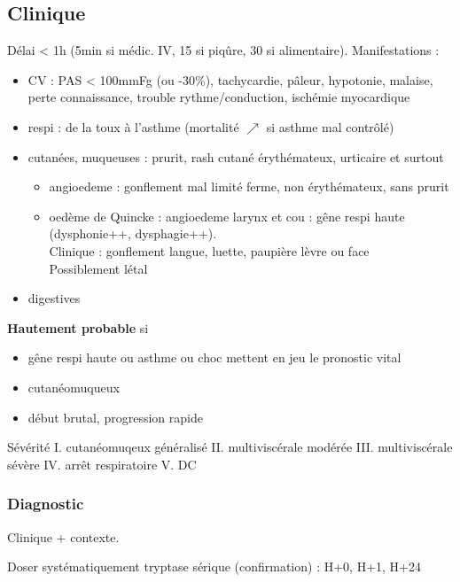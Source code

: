 \documentclass{book}
\begin{document}
\subsection{Clinique}
\label{sec:orge468f6b}
Délai < 1h (5min si médic. IV, 15 si piqûre, 30 si alimentaire).
Manifestations :

\begin{itemize}
\item CV : PAS < 100mmFg (ou -30\%), tachycardie, pâleur, hypotonie, malaise,
perte connaissance, trouble rythme/conduction, ischémie myocardique
\item respi : de la toux à l'asthme (mortalité \(\nearrow\) si asthme mal
contrôlé)
\item cutanées, muqueuses : prurit, rash cutané érythémateux, urticaire et
surtout 

\begin{itemize}
\item angioedeme : gonflement mal limité ferme, non érythémateux, sans
prurit
\item oedème de Quincke : angioedeme larynx et cou : gêne respi haute
(dysphonie++, dysphagie++). \\
Clinique : gonflement langue, luette, paupière lèvre ou face\\
Possiblement létal \faBomb
\end{itemize}

\item digestives
\end{itemize}

\textbf{Hautement probable}  si 

\begin{itemize}
\item gêne respi haute ou asthme ou choc
mettent en jeu le pronostic vital
\item cutanéomuqueux
\item début brutal, progression rapide
\end{itemize}

Sévérité
I. cutanéomuqeux généralisé
II. multiviscérale modérée
III. multiviscérale sévère
IV. arrêt respiratoire
V. DC


\subsubsection{Diagnostic}
\label{sec:orge2ba067}
Clinique + contexte.

Doser systématiquement tryptase sérique (confirmation) : H+0, H+1, H+24
\end{document}
